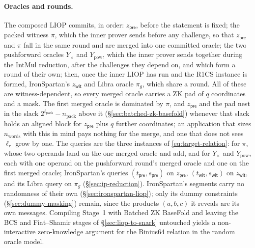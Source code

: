 \documentclass{article}
\theoremstyle{definition}
\begin{document}
\paragraph{Oracles and rounds.}
The composed LIOP commits, in order: $z_{\textsf{pre}}$, before the statement is fixed; the packed witness $\pi$, which the inner prover sends before any challenge, so that $z_{\textsf{pre}}$ and $\pi$ fall in the same round and are merged into one committed oracle; the two pushforward oracles $Y_\times$ and $Y_\text{pow}$, which the inner prover sends together during the IntMul reduction, after the challenges they depend on, and which form a round of their own; then, once the inner LIOP has run and the R1CS instance is formed, IronSpartan's $z_{\textsf{wit}}$ and Libra oracle $\pi_g$, which share a round. All of these are witness-dependent, so every merged oracle carries a ZK pad of $q$ coordinates and a mask. The first merged oracle is dominated by $\pi$, and $z_{\textsf{pre}}$ and the pad nest in the slack $2^{\ell_\text{pack}} - n_\text{pack}$ above it (\S\ref{sec:batched-zk-basefold}) whenever that slack holds an aligned block for $z_{\textsf{pre}}$ plus $q$ further coordinates; an application that sizes $n_\text{words}$ with this in mind pays nothing for the merge, and one that does not sees $\ell_r$ grow by one. The queries are the three instances of \eqref{eq:target-relation}: for $\pi$, whose two operands land on the one merged oracle and add, and for $Y_\times$ and $Y_\text{pow}$, each with one operand on the pushforward round's merged oracle and one on the first merged oracle; IronSpartan's queries $(t_{\textsf{pre}}, s_{\textsf{pre}})$ on $z_{\textsf{pre}}$, $(t_{\textsf{wit}}, s_{\textsf{wit}})$ on $z_{\textsf{wit}}$, and its Libra query on $\pi_g$ (\S\ref{sec:ip-reduction}). IronSpartan's segments carry no randomness of their own (\S\ref{sec:ironspartan-liop}); only its dummy constraints (\S\ref{sec:dummy-masking}) remain, since the products $(a, b, c)$ it reveals are its own messages. Compiling Stage~1 with Batched ZK BaseFold and leaving the BCS and Fiat--Shamir stages of \S\ref{sec:liop-to-snark} untouched yields a non-interactive zero-knowledge argument for the Binius64 relation in the random oracle model.
\end{document}

